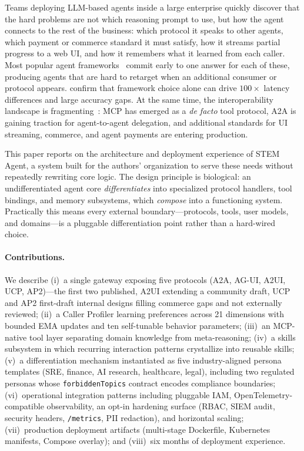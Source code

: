 \documentclass[11pt]{article}
\begin{document}
Teams deploying LLM-based agents inside a large enterprise quickly discover that the hard problems are not which reasoning prompt to use, but how the agent connects to the rest of the business: which protocol it speaks to other agents, which payment or commerce standard it must satisfy, how it streams partial progress to a web UI, and how it remembers what it learned from each caller. Most popular agent frameworks~\citep{tran2025multiagent, ferrag2025agents} commit early to one answer for each of these, producing agents that are hard to retarget when an additional consumer or protocol appears. \citet{orogat2026mafbench} confirm that framework choice alone can drive $100\times$ latency differences and large accuracy gaps. At the same time, the interoperability landscape is fragmenting~\citep{ehtesham2025survey, li2025gluetoprotocols}: MCP has emerged as a \emph{de facto} tool protocol, A2A is gaining traction for agent-to-agent delegation, and additional standards for UI streaming, commerce, and agent payments are entering production.

This paper reports on the architecture and deployment experience of STEM Agent, a system built for the authors' organization to serve these needs without repeatedly rewriting core logic. The design principle is biological: an undifferentiated agent core \emph{differentiates} into specialized protocol handlers, tool bindings, and memory subsystems, which \emph{compose} into a functioning system. Practically this means every external boundary---protocols, tools, user models, and domains---is a pluggable differentiation point rather than a hard-wired choice.

\paragraph{Contributions.} We describe (i)~a single gateway exposing five protocols (A2A, AG-UI, A2UI, UCP, AP2)---the first two published, A2UI extending a community draft, UCP and AP2 first-draft internal designs filling commerce gaps and not externally reviewed; (ii)~a Caller Profiler learning preferences across 21 dimensions with bounded EMA updates and ten self-tunable behavior parameters; (iii)~an MCP-native tool layer separating domain knowledge from meta-reasoning; (iv)~a skills subsystem in which recurring interaction patterns crystallize into reusable skills; (v)~a differentiation mechanism instantiated as five industry-aligned persona templates (SRE, finance, AI research, healthcare, legal), including two regulated personas whose \texttt{forbiddenTopics} contract encodes compliance boundaries; (vi)~operational integration patterns including pluggable IAM, OpenTelemetry-compatible observability, an opt-in hardening surface (RBAC, SIEM audit, security headers, \texttt{/metrics}, PII redaction), and horizontal scaling; (vii)~production deployment artifacts (multi-stage Dockerfile, Kubernetes manifests, Compose overlay); and (viii)~six months of deployment experience.
\end{document}
